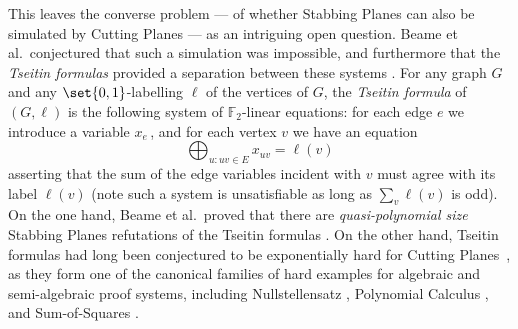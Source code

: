 \documentclass{toc}
\begin{document}
This leaves the converse problem --- of whether Stabbing Planes can also be simulated by Cutting Planes --- as an intriguing open question.
Beame et al.~conjectured that such a simulation was impossible, and furthermore that the \emph{Tseitin formulas} provided a separation between these systems \cite{BeameFIKPPR18}.
For any graph $G$ and any $\set{0,1}$-labelling $\ell$ of the vertices of $G$, the \emph{Tseitin formula} of $(G, \ell)$ is the following system of $\mathbb{F}_2$-linear equations: for each edge $e$ we introduce a variable $x_e\,$, and for each vertex $v$ we have an equation
\[ \bigoplus_{u: uv \in E} x_{uv} = \ell(v)\]
asserting that the sum of the edge variables incident with $v$ must agree with its label $\ell(v)$ (note such a system is unsatisfiable as long as $\sum_v \ell(v)$ is odd).
On the one hand, Beame et al.~proved that there are \emph{quasi-polynomial size} Stabbing Planes refutations of the Tseitin formulas \cite{BeameFIKPPR18}.
On the other hand, Tseitin formulas had long been conjectured to be exponentially hard for Cutting Planes~\cite{CookCT87}, as they form one of the canonical families of hard examples for algebraic and semi-algebraic proof systems, including Nullstellensatz \cite{dima-nsatz}, Polynomial Calculus \cite{bgip}, and Sum-of-Squares \cite{dima-sos,Schoenebeck08}. 
\end{document}
